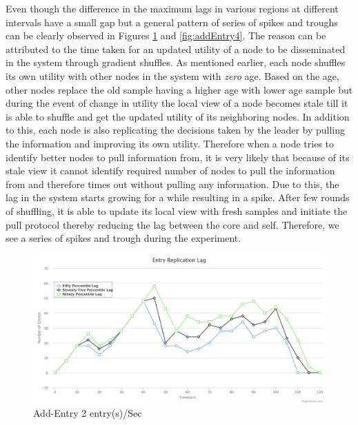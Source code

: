\documentclass[a4paper,11pt]{kth-mag}
\begin{document}
\par Even though the difference in the maximum lags in various regions at different intervals have a small gap but a general pattern of series of spikes and troughs can be clearly observed in Figures \ref{fig:addEntry2} and \ref{fig:addEntry4}. The reason can be attributed to the time taken for an updated utility of a node to be disseminated in the system through gradient shuffles. As mentioned earlier, each node shuffles its own utility with other nodes in the system with \textit{zero} age. Based on the age, other nodes replace the old sample having a higher age with lower age sample but during the event of change in utility the local view of a node becomes stale till it is able to shuffle and get the updated utility of its neighboring nodes. In addition to this, each node is also replicating the decisions taken by the leader by pulling the information and improving its own utility. Therefore when a node tries to identify better nodes to pull information from, it is very likely that because of its stale view it cannot identify required number of nodes to pull the information from and therefore times out without pulling any information.  Due to this, the lag in the system starts growing for a while resulting in a spike. After few rounds of shuffling, it is able to update its local view with fresh samples and initiate the pull protocol thereby reducing the lag between the core and self. Therefore, we see a series of spikes and trough during the experiment.

\begin{figure}[h]
	\includegraphics[scale=0.2]{Add200-2EntryPerSec}
	\caption{Add-Entry 2 entry(s)/Sec}
	\label{fig:addEntry2}
\end{figure}
\end{document}
